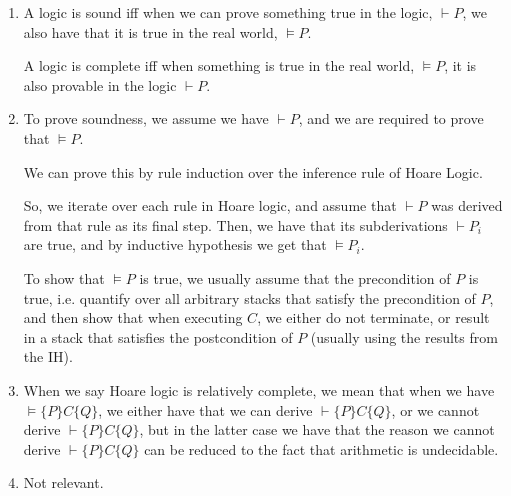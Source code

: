 


\begin{enumerate}[label=(\alph*)]

  \item
    A logic is sound iff when we can prove something true in the logic, $\vdash P$, we also have that it is true in the real world, $\vDash P$.

    A logic is complete iff when something is true in the real world, $\vDash P$, it is also provable in the logic $\vdash P$.

    \item
      To prove soundness, we assume we have $\vdash P$, and we are required to prove that $\vDash P$.

      We can prove this by rule induction over the inference rule of Hoare Logic.

      So, we iterate over each rule in Hoare logic, and assume that $\vdash P$ was derived from that rule as its final step. Then, we have that its subderivations $\vdash P_i$ are true, and by inductive hypothesis we get that $\vDash P_i$.

      To show that $\vDash P$ is true, we usually assume that the precondition of $P$ is true, i.e. quantify over all arbitrary stacks that satisfy the precondition of $P$, and then show that when executing $C$, we either do not terminate, or result in a stack that satisfies the postcondition of $P$ (usually using the results from the IH).

      \item
        When we say Hoare logic is relatively complete, we mean that when we have $\vDash \{P\}C\{Q\}$, we either have that we can derive $\vdash \{P\}C\{Q\}$, or we cannot derive $\vdash \{P\}C\{Q\}$, but in the latter case we have that the reason we cannot derive $\vdash \{P\}C\{Q\}$ can be reduced to the fact that arithmetic is undecidable.

        \item
          Not relevant.


        
    \end{enumerate}


